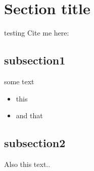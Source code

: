 \section{Section title}

testing
Cite me here: \cite{2004chm..book..363P}

\subsection{subsection1}
some text
\begin{itemize}
\item this
\item and that
\end{itemize}
\subsection{subsection2}
Also this text..

